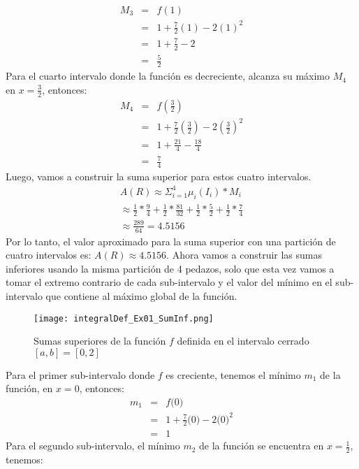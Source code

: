 \begin{ejer}[1]
			\begin{eqnarray*}
				M_3 &=& f(1) \\ 
				&=& 1 + \frac{7}{2}(1) - 2(1)^2 \\ 
				&=& 1 + \frac{7}{2} - 2 \\
				&=& \frac{5}{2}
			\end{eqnarray*}
			Para el cuarto intervalo donde la función es decreciente, alcanza su máximo $M_4$ en $x = \frac{3}{2}$, entonces: 
			\begin{eqnarray*}
				M_4 &=& f(\frac{3}{2}) \\
				&=& 1 + \frac{7}{2}(\frac{3}{2}) - 2(\frac{3}{2})^2 \\ 
				&=& 1 + \frac{21}{4} - \frac{18}{4} \\
				&=& \frac{7}{4}
			\end{eqnarray*}
			Luego, vamos a construir la suma superior para estos cuatro intervalos. 
			\begin{eqnarray*}
				A(R) \approx \Sigma_{i=1}^4 \mu_i (I_i) * M_i \\ 
				\approx \frac{1}{2}*\frac{9}{4} + \frac{1}{2}*\frac{81}{32} + \frac{1}{2}*\frac{5}{2} + \frac{1}{2}*\frac{7}{4} \\ 
				\approx \frac{289}{64} = 4.5156
			\end{eqnarray*}
			Por lo tanto, el valor aproximado para la suma superior con una partición de cuatro intervalos es: $ A(R) \approx 4.5156 $.
			Ahora vamos a construir las sumas inferiores usando la misma partición de 4 pedazos, solo que esta vez vamos a tomar el extremo contrario de cada sub-intervalo y el valor del mínimo en el sub-intervalo que contiene al máximo global de la función. \\
			\begin{figure}[h]
				\texttt{[image: integralDef\_Ex01\_SumInf.png]}
				\caption{Sumas superiores de la función $f$ definida en el intervalo cerrado $[a,b] = [0,2]$}
			\end{figure}
			Para el primer sub-intervalo donde $f$ es creciente, tenemos el mínimo $m_1$ de la función, en $x = 0$, entonces:
			\begin{eqnarray*}
				m_1 &=& f\Big(0 \Big) \\
				&=& 1 + \frac{7}{2}\Big(0 \Big) - 2\Big(0 \Big)^2 \\ 
				&=& 1 
			\end{eqnarray*}
			Para el segundo sub-intervalo, el mínimo $m_2$ de la función se encuentra en $x = \frac{1}{2}$, tenemos:

\end{ejer}
